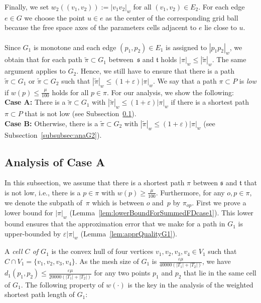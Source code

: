 \documentclass[a4paper,11pt]{article}
\begin{document}
Finally, we set $w_2((v_1,v_2)):= |v_1v_2|_w$ for all $(v_1,v_2) \in E_2$. 
For each edge $e \in G$ we choose the point $u \in e$ as the center of the corresponding grid ball because the free space axes of the parameters cells adjacent to $e$ lie close to $u$. \\  \\
Since $G_1$ is monotone and each edge $(p_1,p_2) \in E_1$ is assigned to $|p_1p_2|_w$, we obtain that for each path $\widetilde{\pi} \subset G_1$ between~$\mathfrak{s}$ and $\mathfrak{t}$ holds $|\pi|_w \leq |\widetilde{\pi}|_w$.  The same argument applies to $G_2$. Hence, we still have to ensure that there is a path $\widetilde{\pi} \subset G_1$ or $\widetilde{\pi} \subset G_2$ such that $|\widetilde{\pi}|_w \leq (1+\varepsilon)|\pi|_w$. We say that a path $\pi \subset P$ is \emph{low} if $w(p) \leq \frac{\mu}{100}$ holds for all $p \in \pi$.  For our analysis, we show the following:\\
	{\bf Case A: }  There is a $\widetilde{\pi} \subset G_1$ with $|\widetilde{\pi}|_w \leq (1+\varepsilon)|\pi|_w$ if there is a shortest path $\pi \subset P$ that is not low (see Subsection~\ref{subsubsec:anaG1}).\\
	{\bf Case B:}  Otherwise, there is a $\widetilde{\pi} \subset G_2$ with $|\widetilde{\pi}|_w \leq (1+\varepsilon)|\pi|_w$ (see Subsection~\ref{subsubsec:anaG2}).

\subsection{Analysis of Case A}\label{subsubsec:anaG1} 

	In this subsection, we assume that there is a shortest path $\pi$ between $\mathfrak{s}$ and $\mathfrak{t}$ that is not low, i.e., there is a $p \in \pi$ with $w(p) \geq \frac{\mu}{100}$. Furthermore, for any $o,p\in \pi$, we denote the subpath of~$\pi$ which is between $o$ and~$p$ by $\pi_{op}$. 
First we prove a lower bound for $|\pi|_w$ (Lemma~\ref{lem:lowerBoundForSummedFDcase1}). This lower bound ensures that the approximation error that we make for a path in $G_1$ is upper-bounded by $\varepsilon |\pi|_w$ (Lemma~\ref{lem:apprQualityG1}).

A \emph{cell $C$ of $G_1$} is the convex hull of four vertices $v_1,v_2,v_3,v_4 \in V_1$ such that $C \cap V_1 = \{ v_1,v_2,v_3,v_4 \}$. As the mesh size of $G_1$ is $\frac{\varepsilon \mu}{40000 (|T_1| + |T_2|)}$, we have $d_1(p_1,p_2) \leq \frac{\varepsilon \mu}{20000 (|T_1| + |T_2|)}$ for any two points $p_1$ and $p_2$ that lie in the same cell of $G_1$. The following property of $w(\cdot)$ is the key in the analysis of the weighted shortest path length of $G_1$:
\end{document}

